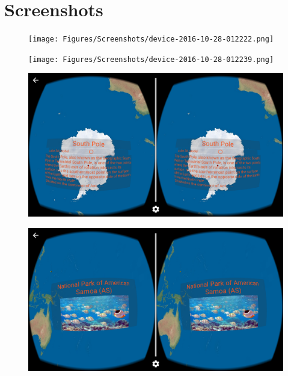\label{appendix-screenshots}
\chapter{Screenshots}

\begin{figure}[H]
	\centering
	\texttt{[image: Figures/Screenshots/device-2016-10-28-012222.png]}
	\decoRule
\end{figure}

\begin{figure}[H]
	\centering
	\texttt{[image: Figures/Screenshots/device-2016-10-28-012239.png]}
	\decoRule
\end{figure}

\begin{figure}[H]
	\centering
	\includegraphics[width=\linewidth, keepaspectratio]{Figures/Screenshots/device-2016-10-28-012336.png}
	\decoRule
\end{figure}

\begin{figure}[H]
	\centering
	\includegraphics[width=\linewidth, keepaspectratio]{Figures/Screenshots/device-2016-10-28-012548.png}
	\decoRule
\end{figure}

